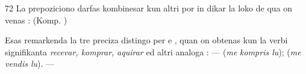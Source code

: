 \begin{VUpage}[76]{72}
La prepoziciono  darfas kombinesar kun altri por in\cc
dikar la loko de qua on venas : \nl
{}\nl
(Komp. )

Esas remarkenda la tre preciza distingo per  e , quan\nl
on obtenas kun la verbi signifikanta \textit{recevar, komprar,}\nl
\textit{aquirar} ed altri analoga : \nl
{}\nl
{} ---  (\textit{me}\nl
\textit{kompris lu});  (\textit{me vendis lu}). --- \parplein
\end{VUpage}

